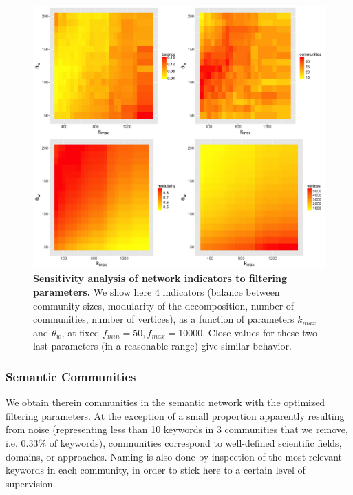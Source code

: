 \begin{figure}
\centering
\includegraphics[width=\linewidth]{figures/Fig6.jpg}
\caption{\textbf{Sensitivity analysis of network indicators to filtering parameters.} We show here 4 indicators (balance between community sizes, modularity of the decomposition, number of communities, number of vertices), as a function of parameters $k_{max}$ and $\theta_w$, at fixed $f_{min} = 50, f_{max} = 10000$. Close values for these two last parameters (in a reasonable range) give similar behavior.}
\label{fig:sensitivity}
\end{figure}





\subsubsection*{Semantic Communities}

We obtain therein communities in the semantic network with the optimized filtering parameters. At the exception of a small proportion apparently resulting from noise (representing less than 10 keywords in 3 communities that we remove, i.e. 0.33\% of keywords), communities correspond to well-defined scientific fields, domains, or approaches. Naming is also done by inspection of the most relevant keywords in each community, in order to stick here to a certain level of supervision.



